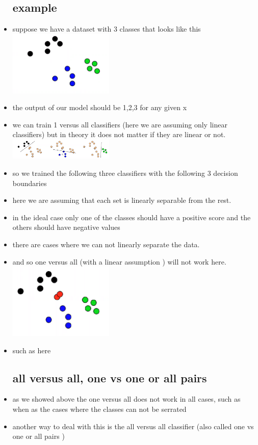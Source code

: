 \documentclass{article}
\begin{document}
\begin{itemize}
\subsection*{example}
\item suppose we have a dataset with 3 classes that looks like this \\
\includegraphics[width=5cm]{lecture_notes/lecture_8/immages/l8_1.png}
\item the output of our model should be 1,2,3 for any given x 
\item we can train 1 versus all classifiers (here we are assuming only linear classifiers) but in theory it does not matter if they are linear or not. 
\\ \includegraphics[width=5cm]{lecture_notes/lecture_8/immages/l8_2.png}
\item so we trained the following three classifiers with the following 3 decision boundaries 
\item here we are assuming that each set is linearly separable from the rest. 
\item in the ideal case only one of the classes should have a positive score and the others should have negative values
\item there are cases where we can not linearly separate the data. 
\item and so one versus all (with a linear assumption ) will not work here. 
\\ \includegraphics[width=5cm]{lecture_notes/lecture_8/immages/l8_3.png}
\item such as here 
\subsection*{all versus all, one vs one or all pairs}
\item as we showed above the one versus all does not work in all cases, such as when as the cases where the classes can not be serrated 
\item another way to deal with this is the all versus all classifier (also called one vs one or all pairs )


\end{itemize}
\end{document}
